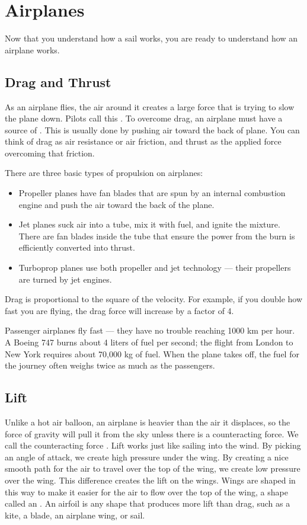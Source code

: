 \chapter{Airplanes}

Now that you understand how a sail works, you are ready to understand how an airplane works.

\section{Drag and Thrust}

As an airplane flies, the air around it creates a large force that is trying to slow the
plane down. Pilots call this .
To overcome drag, an airplane must have a source of . This is usually done by pushing air toward the back of plane. You can think of drag as air resistance or air friction, and thrust as the applied force overcoming that friction.

There are three basic types of propulsion on airplanes:

\begin{itemize}
\item Propeller planes have fan blades that are spun by an internal combustion engine and push the air toward the back of the plane.
\item Jet planes suck air into a tube, mix it with fuel, and ignite the mixture. There are fan blades inside the tube that ensure
the power from the burn is efficiently converted into thrust.
\item Turboprop planes use both propeller and jet technology --- their propellers are turned by jet engines.
\end{itemize}
Drag is proportional to the square of the velocity. For example, if you double how fast you are flying, the drag force will increase by a factor of 4.

Passenger airplanes fly fast --- they have no trouble reaching 1000 km per hour. A Boeing 747 burns about 4 liters of fuel per second; the flight from London to New York requires about 70,000 kg of fuel. When the plane takes off, the fuel for the journey often weighs twice as much as the passengers.

\section{Lift}

Unlike a hot air balloon, an airplane is heavier than the
air it displaces, so the force of gravity will pull it from the sky unless there is a counteracting force. We call the counteracting force .
Lift works just like sailing into the wind. By picking an angle of attack, we create high pressure under the wing. By creating a nice smooth path for the
air to travel over the top of the wing, we create low pressure over the wing. This difference creates the lift on the wings. Wings are shaped in this way 
to make it easier for the air to flow over the top of the wing, a shape called an . An airfoil is any shape that produces more lift than 
drag, such as a kite, a blade, an airplane wing, or sail.


